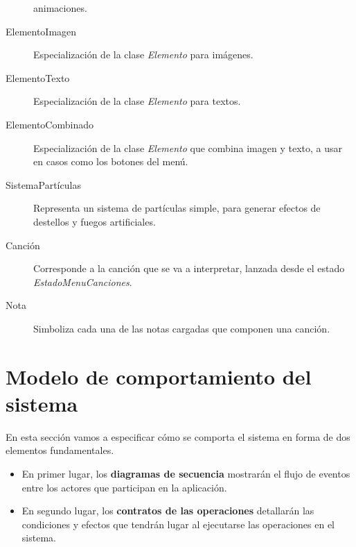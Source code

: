 \begin{description}
  animaciones.
\item[ElementoImagen] Especialización de la clase \textit{Elemento} para
  imágenes.
\item[ElementoTexto] Especialización de la clase \textit{Elemento} para textos.
\item[ElementoCombinado] Especialización de la clase \textit{Elemento} que
  combina imagen y texto, a usar en casos como los botones del menú.
\item[SistemaPartículas] Representa un sistema de partículas simple, para
  generar efectos de destellos y fuegos artificiales.
\item[Canción] Corresponde a la canción que se va a interpretar, lanzada desde
  el estado \textit{EstadoMenuCanciones}.
\item[Nota] Simboliza cada una de las notas cargadas que componen una canción.
\end{description}

\bigskip


\section{Modelo de comportamiento del sistema}
En esta sección vamos a especificar cómo se comporta el sistema en forma de dos
elementos fundamentales.
\begin{itemize}
\item En primer lugar, los \textbf{diagramas de secuencia} mostrarán el flujo de
  eventos entre los actores que participan en la aplicación.
\item En segundo lugar, los \textbf{contratos de las operaciones} detallarán las
  condiciones y efectos que tendrán lugar al ejecutarse las operaciones en el
  sistema.
\end{itemize}


